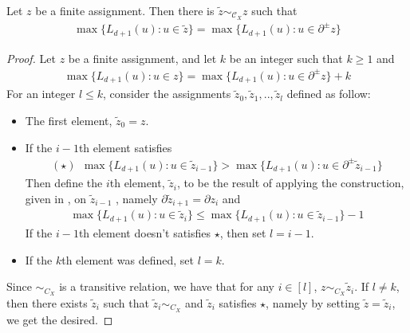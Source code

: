 \begin{claim}
  \label{claim:extermum}
  Let $z$ be a finite assignment. Then there is $\tilde{z} \sim_{\mathcal{C}_{X}} z$ such that 
  \begin{equation*}
    \begin{split}
      \max \big\{ L_{d+1}(u) :  u \in \tilde{z} \big\} = \max \big\{ L_{d+1}(u) : u \in \partial^{\pm} z \big\}
    \end{split}
  \end{equation*}
\end{claim}
\begin{proof}
Let $z$ be a finite assignment, and let $k$ be an integer such that $k \ge 1$ and
  \begin{equation*}
    \begin{split}
            \max \big\{ L_{d+1}(u) :  u \in z \big\} =  \max \big\{ L_{d+1}(u) : u \in \partial^{\pm} z \big\} + k
    \end{split}
  \end{equation*}
  For an integer $l \le k$, consider the assignments $\tilde{z}_{0},\tilde{z}_{1},..,\tilde{z}_{l}$ defined as follow: 
  \begin{itemize}
    \item The first element, $\tilde{z}_{0} = z$. 
    \item If the $i-1$th element satisfies 
  \begin{equation*}
    \begin{split}
      (\star ) \ \ \max \big\{ L_{d+1}(u) :  u \in \tilde{z}_{i-1} \big\} > \max \big\{ L_{d+1}(u) : u \in \partial^{\pm} \tilde{z}_{i-1} \big\} 
    \end{split}
  \end{equation*}
      Then define the $i$th element, $\tilde{z}_{i}$, to be the result of applying the construction, given in , on $\tilde{z}_{i-1}$ , namely  $\partial \tilde{z}_{i+1} = \partial z_{i}$ and  
\begin{equation*}
  \begin{split}
    \max \big\{ L_{d+1}(u) :  u \in \tilde{z}_{i} \big\} \le  \max \big\{ L_{d+1}(u) : u \in \tilde{z}_{i-1} \big\} - 1
  \end{split}
\end{equation*}
If the $i-1$th element doesn't satisfies $\star$, then set $l = i -1$.
\item If the $k$th element was defined, set $l = k$.
  \end{itemize}
Since $\sim_{C_{X}}$ is a transitive relation, we have that for any $i \in [l]$, $z \sim_{C_{X}} \tilde{z}_{i}$. If $l \neq k$, then there exists $\tilde{z}_{i}$ such that $\tilde{z}_{i} \sim_{C_{X}}$ and $\tilde{z}_{i}$ satisfies $\star$, namely by setting $\tilde{z} = \tilde{z}_{i}$, we get the desired.

\end{proof}
